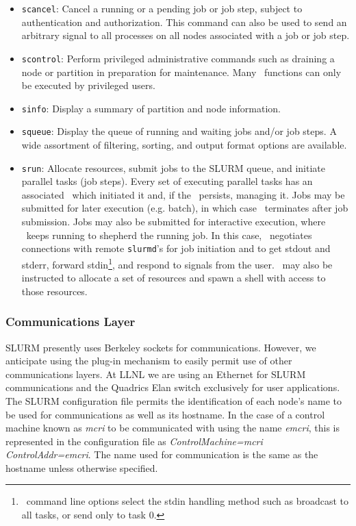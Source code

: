 \begin{itemize}
\item {\tt scancel}: Cancel a running or a pending job or job step, 
subject to authentication and authorization. This command can also 
be used to send an arbitrary signal to all processes on all nodes 
associated with a job or job step.

\item {\tt scontrol}: Perform privileged administrative commands
such as draining a node or partition in preparation for maintenance. 
Many \scontrol\ functions can only be executed by privileged users.

\item {\tt sinfo}: Display a summary of partition and node information.

\item {\tt squeue}: Display the queue of running and waiting jobs 
and/or job steps. A wide assortment of filtering, sorting, and output 
format options are available.

\item {\tt srun}: Allocate resources, submit jobs to the SLURM queue,
and initiate parallel tasks (job steps). 
Every set of executing parallel tasks has an associated \srun\ which 
initiated it and, if the \srun\ persists, managing it. 
Jobs may be submitted for later execution (e.g. batch), in which case 
\srun\ terminates after job submission. 
Jobs may also be submitted for interactive execution, where \srun\ keeps 
running to shepherd the running job. In this case, 
\srun\ negotiates connections with remote {\tt slurmd}'s 
for job initiation and to
get stdout and stderr, forward stdin\footnote{\srun\ command
line options select the stdin handling method such as broadcast to all
tasks, or send only to task 0.}, and respond to signals from the user.
\srun\ may also be instructed to allocate a set of resources and
spawn a shell with access to those resources.

\end{itemize}

\subsubsection{Communications Layer}

SLURM presently uses Berkeley sockets for communications. 
However, we anticipate using the plug-in mechanism to easily 
permit use of other communications layers. 
At LLNL we are using an Ethernet for SLURM communications and 
the Quadrics Elan switch exclusively for user applications. 
The SLURM configuration file permits the identification of each 
node's name to be used for communications as well as its hostname. 
In the case of a control machine known as {\em mcri} to be communicated 
with using the name {\em emcri}, this is represented in the 
configuration file as {\em ControlMachine=mcri ControlAddr=emcri}.
The name used for communication is the same as the hostname unless 
otherwise specified.

